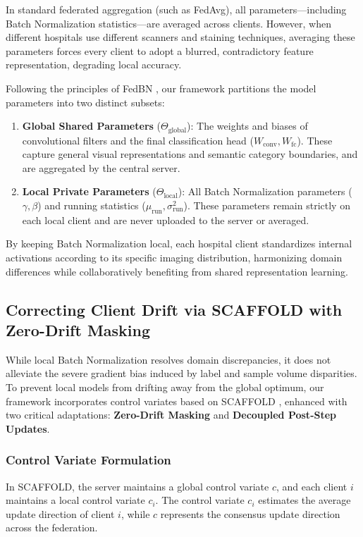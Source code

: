 In standard federated aggregation (such as FedAvg), all parameters—including Batch Normalization statistics—are averaged across clients. However, when different hospitals use different scanners and staining techniques, averaging these parameters forces every client to adopt a blurred, contradictory feature representation, degrading local accuracy.

Following the principles of FedBN \cite{li2021fedbn}, our framework partitions the model parameters into two distinct subsets:
\begin{enumerate}
    \item \textbf{Global Shared Parameters} ($\Theta_{\text{global}}$): The weights and biases of convolutional filters and the final classification head ($W_{\text{conv}}, W_{\text{fc}}$). These capture general visual representations and semantic category boundaries, and are aggregated by the central server.
    \item \textbf{Local Private Parameters} ($\Theta_{\text{local}}$): All Batch Normalization parameters ($\gamma, \beta$) and running statistics ($\mu_{\text{run}}, \sigma_{\text{run}}^2$). These parameters remain strictly on each local client and are never uploaded to the server or averaged.
\end{enumerate}

By keeping Batch Normalization local, each hospital client standardizes internal activations according to its specific imaging distribution, harmonizing domain differences while collaboratively benefiting from shared representation learning.

\subsection{Correcting Client Drift via SCAFFOLD with Zero-Drift Masking}
\label{subsec:scaffold_drift_correction}

While local Batch Normalization resolves domain discrepancies, it does not alleviate the severe gradient bias induced by label and sample volume disparities. To prevent local models from drifting away from the global optimum, our framework incorporates control variates based on SCAFFOLD \cite{karimireddy2020scaffold}, enhanced with two critical adaptations: \textbf{Zero-Drift Masking} and \textbf{Decoupled Post-Step Updates}.

\subsubsection{Control Variate Formulation}
In SCAFFOLD, the server maintains a global control variate $c$, and each client $i$ maintains a local control variate $c_i$. The control variate $c_i$ estimates the average update direction of client $i$, while $c$ represents the consensus update direction across the federation. 

